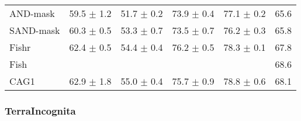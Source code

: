 \documentclass{article}
\begin{document}
\begin{center}
{\begin{tabular}{lccccc}
AND-mask             & 59.5 $\pm$ 1.2       & 51.7 $\pm$ 0.2       & 73.9 $\pm$ 0.4       & 77.1 $\pm$ 0.2       & 65.6                 \\
SAND-mask            & 60.3 $\pm$ 0.5       & 53.3 $\pm$ 0.7       & 73.5 $\pm$ 0.7       & 76.2 $\pm$ 0.3       & 65.8                 \\
Fishr                & 62.4 $\pm$ 0.5       & 54.4 $\pm$ 0.4       & 76.2 $\pm$ 0.5       & 78.3 $\pm$ 0.1       & 67.8                 \\
Fish                 &                      &                      &                      &                      & 68.6                 \\
\midrule
CAG1                 & 62.9 $\pm$ 1.8       & 55.0 $\pm$ 0.4       & 75.7 $\pm$ 0.9       & 78.8 $\pm$ 0.6       & 68.1                 \\
\bottomrule
\end{tabular}}
\end{center}

\subsubsection{TerraIncognita}
\end{document}
